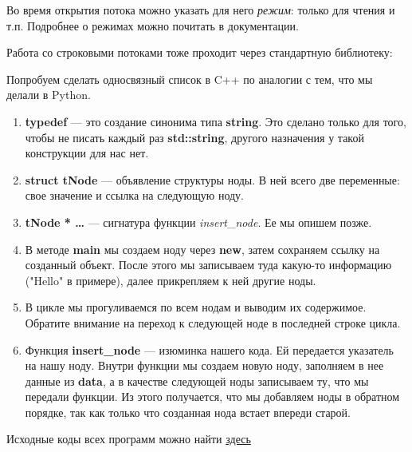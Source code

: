 \begin{lecture}[\lectureSubject]
\begin{lecSection}
		Во время открытия потока можно указать для него \textit{режим}: только для чтения и т.п.
		Подробнее о режимах можно почитать в документации.
	\end{lecSection}	
	\begin{lecSection}
		Работа со строковыми потоками тоже проходит через стандартную библиотеку:
	\end{lecSection}
	\begin{lecSection}
		Попробуем сделать односвязный список в C++ по аналогии с тем, что мы делали в Python.
		\begin{enumerate}
			\item 		\textbf{typedef} --- это создание синонима типа \textbf{string}. Это сделано только для того, чтобы не писать каждый раз \textbf{std::string}, другого назначения у такой конструкции для нас нет.
			\item \textbf{struct tNode} --- объявление структуры ноды. В ней всего две переменные: свое значение и ссылка на следующую ноду.
			\item \textbf{tNode * \dots} --- сигнатура функции \textit{insert}\_\textit{node}. Ее мы опишем позже.
			\item В методе \textbf{main} мы создаем ноду через \textbf{new}, затем сохраняем ссылку на созданный объект. После этого мы записываем туда какую-то информацию ("Hello" в примере), далее прикрепляем к ней другие ноды.
			\item В цикле мы прогуливаемся по всем нодам и выводим их содержимое. Обратите внимание на переход к следующей ноде в последней строке цикла.
			\item Функция \textbf{insert\_node} --- изюминка нашего кода. Ей передается указатель на нашу ноду. Внутри функции мы создаем новую ноду, заполняем в нее данные из \textbf{data}, а в качестве следующей ноды записываем ту, что мы передали функции. Из этого получается, что мы добавляем ноды в обратном порядке, так как только что созданная нода встает впереди старой.
		\end{enumerate}
	\end{lecSection}
			\begin{center}
				{Исходные коды всех программ можно найти \href{https://github.com/alekseik1/cpp\_lections\_2017/tree/master/lection\%205}{здесь}}
			\end{center}
\end{lecture}

